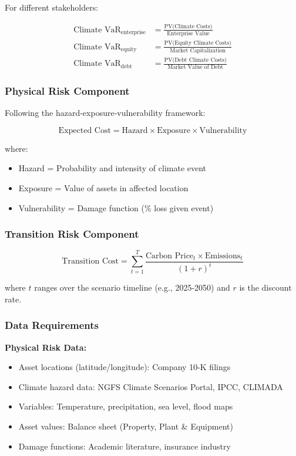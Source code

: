 \documentclass[11pt,a4paper]{article}
\begin{document}
For different stakeholders:

\begin{align}
\text{Climate VaR}_{\text{enterprise}} &= \frac{\text{PV(Climate Costs)}}{\text{Enterprise Value}}\\
\text{Climate VaR}_{\text{equity}} &= \frac{\text{PV(Equity Climate Costs)}}{\text{Market Capitalization}}\\
\text{Climate VaR}_{\text{debt}} &= \frac{\text{PV(Debt Climate Costs)}}{\text{Market Value of Debt}}
\end{align}

\subsubsection{Physical Risk Component}

Following the hazard-exposure-vulnerability framework:

\begin{equation}
\text{Expected Cost} = \text{Hazard} \times \text{Exposure} \times \text{Vulnerability}
\end{equation}

where:
\begin{itemize}
    \item Hazard = Probability and intensity of climate event
    \item Exposure = Value of assets in affected location
    \item Vulnerability = Damage function (\% loss given event)
\end{itemize}

\subsubsection{Transition Risk Component}

\begin{equation}
\text{Transition Cost} = \sum_{t=1}^{T} \frac{\text{Carbon Price}_t \times \text{Emissions}_t}{(1+r)^t}
\end{equation}

where $t$ ranges over the scenario timeline (e.g., 2025-2050) and $r$ is the discount rate.

\subsubsection{Data Requirements}

\textbf{Physical Risk Data:}
\begin{itemize}
    \item Asset locations (latitude/longitude): Company 10-K filings
    \item Climate hazard data: NGFS Climate Scenarios Portal, IPCC, CLIMADA
    \item Variables: Temperature, precipitation, sea level, flood maps
    \item Asset values: Balance sheet (Property, Plant \& Equipment)
    \item Damage functions: Academic literature, insurance industry
\end{itemize}
\end{document}
